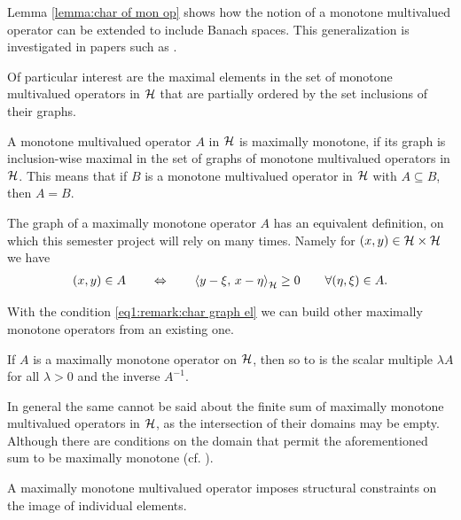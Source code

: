 \begin{remark}
	Lemma \ref{lemma:char of mon op} shows how the notion of a monotone
	multivalued operator can be extended to include Banach spaces. This
	generalization is investigated in papers such as \cite{10.2307/2373376}. 
\end{remark}

Of particular interest are the maximal elements in the set of monotone 
multivalued operators in $ \mathcal{H} $ that are partially ordered by the set inclusions
of their graphs.

\begin{definition}
	A monotone multivalued operator $ A $ in $ \mathcal{H} $ is maximally monotone, if its graph is 
	inclusion-wise maximal in the set of graphs of monotone multivalued operators in $ \mathcal{H} $. 
	This means that if $ B $ is a monotone multivalued operator in $ \mathcal{H} $
	with $ A\subseteq B $, then $ A=B $. 
\end{definition}

\begin{remark}\label{remark:char graph el}
	The graph of a maximally monotone operator $ A $ has an equivalent
	definition, on which this semester project will rely on many times. Namely for 
	$ (x,y)\in\mathcal{H} \times \mathcal{H} $ we have
	\begin{align}\label{eq1:remark:char graph el}
		(x,y)\in A
		\qquad\Leftrightarrow\qquad
		\left\langle y-\xi,\,x-\eta\right\rangle_{\mathcal{H}}\geq 0
		\qquad\forall (\eta,\xi)\in A.
	\end{align} 
\end{remark}

With the condition \eqref{eq1:remark:char graph el} 
we can build other maximally monotone
operators from an existing one.

\begin{example}\label{example:easy examples of max mon op}
	If $ A $ is a maximally monotone operator on $ \mathcal{H} $, then so to is
	the scalar multiple $ \lambda A $ for all $ \lambda>0 $ and the inverse
	$ A^{-1} $. \smallskip
	
	In general the same cannot be said about the finite sum of maximally 
	monotone multivalued operators in $ \mathcal{H} $, as the intersection
	of their domains may be empty. Although there are conditions on the domain
	that permit the aforementioned sum to be maximally monotone 
	(cf. \cite[Chapter 2.6]{brezis1973ope}).
\end{example}

A maximally monotone multivalued operator imposes structural constraints 
on the image of individual elements.

